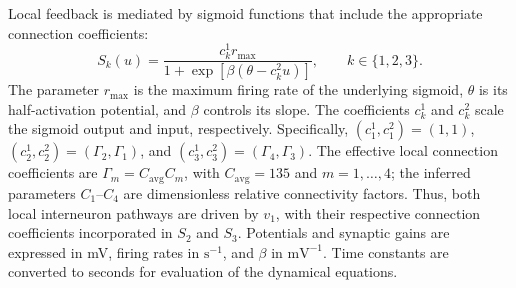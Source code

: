 \documentclass{article}
\begin{document}
Local feedback is mediated by sigmoid functions that include the appropriate connection coefficients:
\begin{equation}
S_k(u)=\frac{c_k^{1}r_{\max}}
{1+\exp\!\left[\beta\left(\theta-c_k^{2}u\right)\right]},
\qquad k\in\{1,2,3\}.
\tag{1.7}\label{eq:jr_sigmoid}
\end{equation}
The parameter $r_{\max}$ is the maximum firing rate of the underlying sigmoid, $\theta$ is its half-activation potential, and $\beta$ controls its slope. The coefficients $c_k^1$ and $c_k^2$ scale the sigmoid output and input, respectively. Specifically, $(c_1^1,c_1^2)=(1,1)$, $(c_2^1,c_2^2)=(\Gamma_2,\Gamma_1)$, and $(c_3^1,c_3^2)=(\Gamma_4,\Gamma_3)$. The effective local connection coefficients are $\Gamma_m=C_{\mathrm{avg}}C_m$, with $C_{\mathrm{avg}}=135$ and $m=1,\ldots,4$; the inferred parameters $C_1$--$C_4$ are dimensionless relative connectivity factors. Thus, both local interneuron pathways are driven by $v_1$, with their respective connection coefficients incorporated in $S_2$ and $S_3$. Potentials and synaptic gains are expressed in mV, firing rates in $\mathrm{s}^{-1}$, and $\beta$ in $\mathrm{mV}^{-1}$. Time constants are converted to seconds for evaluation of the dynamical equations.
\end{document}
